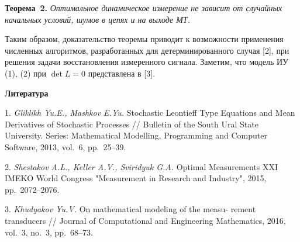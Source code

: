 \textbf{Теорема~2.} {\it 	
Оптимальное динамическое измерение не зависит от случайных начальных условий, шумов в цепях и на выходе МТ.	
	 }
	
Таким образом, доказательство теоремы приводит к возможности применения численных алгоритмов, разработанных для детерминированного случая [2], при решения задачи восстановления измеренного сигнала.  Заметим, что модель ИУ (1), (2) при $\det L=0$ представлена в [3].


\smallskip \centerline {\bf Литература} \nopagebreak

1. {\it Gliklikh Yu.E., Mashkov E.Yu.} Stochastic Leontieff Type Equations and Mean Derivatives of Stochastic Processes // Bulletin of the South Ural State University. Series: Mathematical Modelling, Programming and Computer Software,  2013, vol.~6, pp.~25--39.

2. {\it Shestakov A.L., Keller A.V., Sviridyuk G.A.} Optimal Measurements XXI IMEKO World Congress "Measurement in Research and Industry", 2015, pp.~2072--2076.

3. {\it Khudyakov Yu.V.} On mathematical modeling of the measu- \- rement transducers
// Journal of Computational and Engineering Mathematics, 2016, vol.~3, no.~3, pp.~68--73.



% 